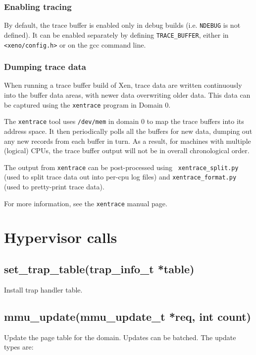 \documentclass[11pt,twoside,final,openright]{xenstyle}
\begin{document}
\subsection{Enabling tracing}

By default, the trace buffer is enabled only in debug builds (i.e. {\tt NDEBUG}
is not defined).  It can be enabled separately by defining {\tt TRACE\_BUFFER},
either in {\tt <xeno/config.h>} or on the gcc command line.

\subsection{Dumping trace data}

When running a trace buffer build of Xen, trace data are written continuously
into the buffer data areas, with newer data overwriting older data.  This data
can be captured using the {\tt xentrace} program in Domain 0.

The {\tt xentrace} tool uses {\tt /dev/mem} in domain 0 to map the trace
buffers into its address space.  It then periodically polls all the buffers for
new data, dumping out any new records from each buffer in turn.  As a result,
for machines with multiple (logical) CPUs, the trace buffer output will not be
in overall chronological order.

The output from {\tt xentrace} can be post-processed using {\tt
xentrace\_split.py} (used to split trace data out into per-cpu log files) and
{\tt xentrace\_format.py} (used to pretty-print trace data).

For more information, see the {\tt xentrace} manual page.


\chapter{Hypervisor calls}

\section{ set\_trap\_table(trap\_info\_t *table)} 

Install trap handler table.

\section{ mmu\_update(mmu\_update\_t *req, int count)} 
Update the page table for the domain. Updates can be batched.
The update types are: 
\end{document}

